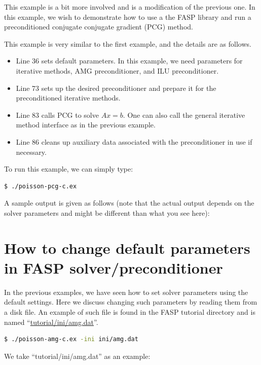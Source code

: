 \documentclass[11pt]{memoir}
\begin{document}
This example is a bit more involved and is a modification of the
previous one. In this example, we wish to demonstrate how to use a the
FASP library and run a preconditioned conjugate conjugate gradient (PCG) method.
%

%
This example is very similar to the first example, and the details are
as follows. 
\begin{itemize}
%
\item Line 36 sets default parameters. In this example, we need parameters for iterative methods, AMG preconditioner, and ILU preconditioner. 
%
\item Line 73 sets up the desired preconditioner and prepare it for the preconditioned iterative methods.
%
\item Line 83 calls PCG to solve $Ax=b$. One can also call the general iterative method interface as in the previous example.
%
\item Line 86 cleans up auxiliary data associated with the preconditioner in use if necessary. 
%
\end{itemize}
%
To run this example, we can simply type:
%
\begin{lstlisting}[numbers=none]
$ ./poisson-pcg-c.ex
\end{lstlisting}
%
A sample output is given as follows (note that the actual output depends on the solver parameters and might be different than what you see here):



\section{How to change default parameters in FASP
  solver/preconditioner}\label{sec:parameters}

In the previous examples, we have seen how to set solver parameters
using the default settings. Here we discuss changing such parameters
by reading them from a disk file. An example of such file is found in the FASP
tutorial directory and is named ``\url{tutorial/ini/amg.dat}''.
%
\begin{lstlisting}[numbers=none,language=sh]
$ ./poisson-amg-c.ex -ini ini/amg.dat
\end{lstlisting}
%
We take ``tutorial/ini/amg.dat'' as an example:

\end{document}
